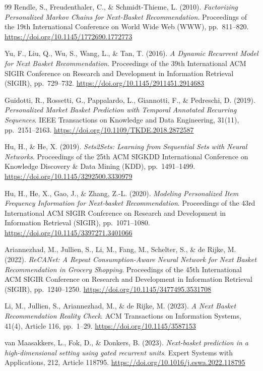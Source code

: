 \documentclass[12pt,a4paper]{report}
\begin{document}
\begin{thebibliography}{99}
Rendle, S., Freudenthaler, C., \& Schmidt-Thieme, L. (2010).
\textit{Factorizing Personalized Markov Chains for Next-Basket Recommendation}.
Proceedings of the 19th International Conference on World Wide Web (WWW), pp.\ 811--820. \url{https://doi.org/10.1145/1772690.1772773}

Yu, F., Liu, Q., Wu, S., Wang, L., \& Tan, T. (2016).
\textit{A Dynamic Recurrent Model for Next Basket Recommendation}.
Proceedings of the 39th International ACM SIGIR Conference on Research and Development in Information Retrieval (SIGIR), pp.\ 729--732. \url{https://doi.org/10.1145/2911451.2914683}

Guidotti, R., Rossetti, G., Pappalardo, L., Giannotti, F., \& Pedreschi, D. (2019).
\textit{Personalized Market Basket Prediction with Temporal Annotated Recurring Sequences}.
IEEE Transactions on Knowledge and Data Engineering, 31(11), pp.\ 2151--2163. \url{https://doi.org/10.1109/TKDE.2018.2872587}

Hu, H., \& He, X. (2019).
\textit{Sets2Sets: Learning from Sequential Sets with Neural Networks}.
Proceedings of the 25th ACM SIGKDD International Conference on Knowledge Discovery \& Data Mining (KDD), pp.\ 1491--1499. \url{https://doi.org/10.1145/3292500.3330979}

Hu, H., He, X., Gao, J., \& Zhang, Z.-L. (2020).
\textit{Modeling Personalized Item Frequency Information for Next-basket Recommendation}.
Proceedings of the 43rd International ACM SIGIR Conference on Research and Development in Information Retrieval (SIGIR), pp.\ 1071--1080. \url{https://doi.org/10.1145/3397271.3401066}

Ariannezhad, M., Jullien, S., Li, M., Fang, M., Schelter, S., \& de Rijke, M. (2022).
\textit{ReCANet: A Repeat Consumption-Aware Neural Network for Next Basket Recommendation in Grocery Shopping}.
Proceedings of the 45th International ACM SIGIR Conference on Research and Development in Information Retrieval (SIGIR), pp.\ 1240--1250. \url{https://doi.org/10.1145/3477495.3531708}

Li, M., Jullien, S., Ariannezhad, M., \& de Rijke, M. (2023).
\textit{A Next Basket Recommendation Reality Check}.
ACM Transactions on Information Systems, 41(4), Article 116, pp.\ 1--29. \url{https://doi.org/10.1145/3587153}

van Maasakkers, L., Fok, D., \& Donkers, B. (2023).
\textit{Next-basket prediction in a high-dimensional setting using gated recurrent units}.
Expert Systems with Applications, 212, Article 118795. \url{https://doi.org/10.1016/j.eswa.2022.118795}


\end{thebibliography}
\end{document}

